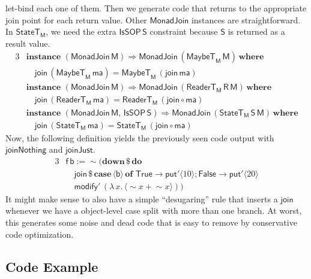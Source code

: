 \documentclass[acmsmall,screen]{acmart}
\newcommand{\mit}[1]{{\mathsf{#1}}}
\newcommand{\msf}[1]{{\mathsf{#1}}}
\newcommand{\mbf}[1]{{\mathbf{#1}}}
\newcommand{\bs}[1]{\boldsymbol{#1}}
\newcommand{\mdo}{\mbf{do}\,}
\newcommand{\ind}{\hspace{1em}}
\newcommand{\where}{\mbf{where}}
\newcommand{\M}{\msf{M}}
\newcommand{\of}{\mbf{of}\,}
\newcommand{\vma}{\mathsf{ma}}
\newcommand{\vS}{\mathsf{S}}
\newcommand{\vR}{\mathsf{R}}
\newcommand{\vM}{\mathsf{M}}
\newcommand{\vb}{\mathsf{b}}
\newcommand{\vf}{\mathsf{f}}
\newcommand{\IsSOP}{\msf{IsSOP}}
\newcommand{\ReaderT}{\msf{ReaderT}}
\newcommand{\case}{\mbf{case\,}}
\newcommand{\spl}{{\bs{\sim}}}
\newcommand{\ql}{{\bs{\langle}}}
\newcommand{\qr}{{\bs{\rangle}}}
\newcommand{\True}{\msf{True}}
\newcommand{\False}{\msf{False}}
\newcommand{\MaybeT}{\msf{MaybeT}}
\theoremstyle{remark}
\newcommand{\mdown}{\mbf{down}}
\newcommand{\instance}{\mbf{instance}\,}
\newcommand{\qt}[1]{\ql#1\qr}
\newcommand{\RA}{\Rightarrow}
\newcommand{\StateT}{\msf{StateT}}
\newcommand{\dlr}{\,\$\,}
\newcommand{\MonadJoin}{\msf{MonadJoin}}
\newcommand{\join}{\mit{join}}
\newcommand{\modify}{\mit{modify}}
\newcommand{\mput}{\mit{put}}
\begin{document}
let-bind each one of them. Then we generate code that returns to the appropriate
join point for each return value. Other $\MonadJoin$ instances are straightforward. In
$\StateT_\M$, we need the extra $\IsSOP\,\vS$ constraint because $\vS$ is returned
as a result value.
\begin{alignat*}{3}
  & \instance\,(\MonadJoin\,\vM) \RA \MonadJoin\,(\MaybeT_\M\,\vM)\,\where\\
  & \ind \join\,(\MaybeT_\M\,\vma) = \MaybeT_\M\,(\join\,\vma)\\
  & \instance\,(\MonadJoin\,\vM) \RA \MonadJoin\,(\ReaderT_\M\,\vR\,\vM)\,\where\\
  & \ind \join\,(\ReaderT_\M\,\vma) = \ReaderT_\M\,(\join \circ \vma)\\
  & \instance\,(\MonadJoin\,\vM,\,\IsSOP\,\vS) \RA \MonadJoin\,(\StateT_\M\,\vS\,\vM)\,\where\\
  & \ind \join\,(\StateT_\M\,\vma) = \StateT_\M\,(\join \circ \vma)
\end{alignat*}
Now, the following definition yields the previously seen code output with
$\msf{joinNothing}$ and $\msf{joinJust}$.
\begin{alignat*}{3}
  & \vf\,\vb := \spl(\mdown \dlr \mdo \\
  & \ind \join \dlr \case \qt{\vb}\,\of\,\True\to \mput' \qt{10}; \False \to \mput' \qt{20}\\
  & \ind\modify'\,(\lambda\,x.\,\qt{\spl x + \spl x}))
\end{alignat*}
It might make sense to also have a simple ``desugaring'' rule that inserts a
$\join$ whenever we have a object-level case split with more than one branch. At
worst, this generates some noise and dead code that is easy to remove by
conservative code optimization.

\subsection{Code Example}
\end{document}
